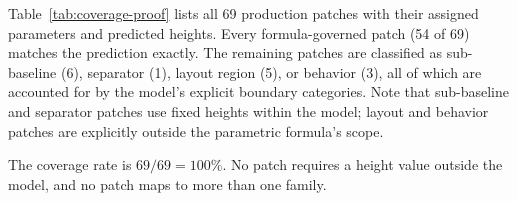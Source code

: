 Table~\ref{tab:coverage-proof} lists all 69 production patches with their assigned parameters and predicted heights. Every formula-governed patch (54 of 69) matches the prediction exactly. The remaining patches are classified as sub-baseline (6), separator (1), layout region (5), or behavior (3), all of which are accounted for by the model's explicit boundary categories. Note that sub-baseline and separator patches use fixed heights within the model; layout and behavior patches are explicitly outside the parametric formula's scope.



The coverage rate is $69/69 = 100\%$. No patch requires a height value outside the model, and no patch maps to more than one family.
